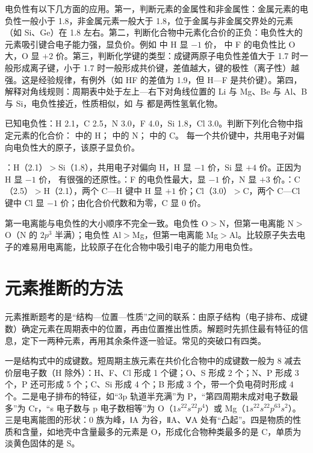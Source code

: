 电负性有以下几方面的应用。第一，判断元素的金属性和非金属性：金属元素的电负性一般小于 1.8，非金属元素一般大于 1.8，位于金属与非金属交界处的元素（如 Si、Ge）在 1.8 左右。第二，判断化合物中元素化合价的正负：电负性大的元素吸引键合电子能力强，显负价。例如  中 H 显 $-1$ 价， 中 F 的电负性比 O 大，O 显 $+2$ 价。第三，判断化学键的类型：成键两原子电负性差值大于 1.7 时一般形成离子键，小于 1.7 时一般形成共价键，差值越大，键的极性（离子性）越强。这是经验规律，有例外（如 HF 的差值为 1.9，但 H—F 是共价键）。第四，解释对角线规则：周期表中处于左上—右下对角线位置的 Li 与 Mg、Be 与 Al、B 与 Si，电负性接近，性质相似，如  与  都是两性氢氧化物。

\begin{liti}[典型]
已知电负性：H 2.1，C 2.5，N 3.0，F 4.0，Si 1.8，Cl 3.0。判断下列化合物中指定元素的化合价： 中的 H； 中的 N； 中的 C。
\tcblower
\silu 每一个共价键中，共用电子对偏向电负性大的原子，该原子显负价。\par
\jie {}：H（2.1）$>$Si（1.8），共用电子对偏向 H，H 显 $-1$ 价，Si 显 $+4$ 价。正因为 H 显 $-1$ 价， 有很强的还原性。：F 的电负性最大，显 $-1$ 价，N 显 $+3$ 价。：C（2.5）$>$H（2.1），两个 C—H 键中 H 显 $+1$ 价；Cl（3.0）$>$C，两个 C—Cl 键中 Cl 显 $-1$ 价；由化合价代数和为零，C 显 0 价。
\end{liti}

\begin{yicuo}
第一电离能与电负性的大小顺序不完全一致。电负性 O$>$N，但第一电离能 N$>$O（N 的 $2p^3$ 半满）；电负性 Al$>$Mg，但第一电离能 Mg$>$Al。比较原子失去电子的难易用电离能，比较原子在化合物中吸引电子的能力用电负性。
\end{yicuo}

\section{元素推断的方法}
元素推断题考的是“结构—位置—性质”之间的联系：由原子结构（电子排布、成键数）确定元素在周期表中的位置，再由位置推出性质。解题时先抓住最有特征的信息，定下一两种元素，再用其余条件逐一验证。常见的突破口有四类。

一是结构式中的成键数。短周期主族元素在共价化合物中的成键数一般为 8 减去价层电子数（H 除外）：H、F、Cl 形成 1 个键；O、S 形成 2 个；N、P 形成 3 个，P 还可形成 5 个；C、Si 形成 4 个；B 形成 3 个，带一个负电荷时形成 4 个。二是电子排布的特征，如“3p 轨道半充满”为 P，“第四周期未成对电子数最多”为 Cr，“s 电子数与 p 电子数相等”为 O（$1s^22s^22p^4$）或 Mg（$1s^22s^22p^63s^2$）。三是电离能图的形状：0 族为峰，ⅠA 为谷，ⅡA、ⅤA 处有“凸起”。四是物质的性质和含量，如地壳中含量最多的元素是 O，形成化合物种类最多的是 C，单质为淡黄色固体的是 S。


